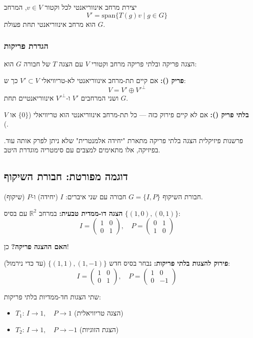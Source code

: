 \begin{theorembox}{יצירת מרחב אינווריאנטי}
לכל וקטור $v \in V$, המרחב
\[
V' = \text{span}\{T(g)v \mid g \in G\}
\]
הוא מרחב אינווריאנטי תחת פעולת $G$.
\end{theorembox}

\subsubsection{הגדרת פריקות}

\begin{definitionbox}{הצגה פריקה ובלתי פריקה}
מרחב וקטורי $V$ עם הצגה $T$ של חבורה $G$ הוא:

\textbf{פריק ():} אם קיים תת-מרחב אינווריאנטי לא-טריוויאלי $V' \subset V$ כך ש:
\[
V = V' \oplus V'^\perp
\]
ושני המרחבים $V'$ ו-$V'^\perp$ אינווריאנטיים תחת $G$.

\textbf{בלתי פריק ():} אם לא קיים פירוק כזה — כל תת-מרחב אינווריאנטי הוא טריוויאלי ($\{0\}$ או $V$).
\end{definitionbox}

\begin{notebox}{פרשנות פיזיקלית}
הצגה בלתי פריקה מתארת "יחידה אלמנטרית" שלא ניתן לפרק אותה עוד. בפיזיקה, אלו מתאימים למצבים עם סימטריה מוגדרת היטב.
\end{notebox}

\subsection{דוגמה מפורטת: חבורת השיקוף}

\begin{examplebox}{חבורת השיקוף $G = \{I, P\}$}
חבורה עם שני איברים: $I$ (יחידה) ו-$P$ (שיקוף).

\textbf{הצגה דו-ממדית טבעית:} במרחב $\mathbb{R}^2$ עם בסיס $\{(1,0), (0,1)\}$:
\[
I = \begin{pmatrix} 1 & 0 \\ 0 & 1 \end{pmatrix}, \quad
P = \begin{pmatrix} 0 & 1 \\ 1 & 0 \end{pmatrix}
\]

\textbf{האם ההצגה פריקה?} כן! 

\textbf{פירוק להצגות בלתי פריקות:} נבחר בסיס חדש $\{(1,1), (1,-1)\}$ (עד כדי נירמול):
\[
I = \begin{pmatrix} 1 & 0 \\ 0 & 1 \end{pmatrix}, \quad
P = \begin{pmatrix} 1 & 0 \\ 0 & -1 \end{pmatrix}
\]

שתי הצגות חד-ממדיות בלתי פריקות:
\begin{itemize}
    \item $T_1$: $I \to 1, \quad P \to 1$ (הצגה טריוויאלית)
    \item $T_2$: $I \to 1, \quad P \to -1$ (הצגת הזוגיות)
\end{itemize}
\end{examplebox}

